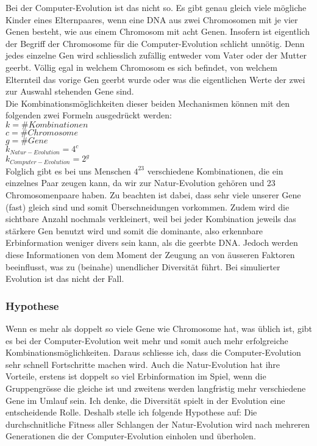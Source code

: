 \documentclass[11pt,a4paper,ngerman]{article}
\begin{document}
Bei der Computer-Evolution ist das nicht so. Es gibt genau gleich viele mögliche Kinder eines Elternpaares, wenn eine DNA aus zwei Chromosomen mit je vier Genen besteht, wie aus einem Chromosom mit acht Genen. Insofern ist eigentlich der Begriff der Chromosome für die Computer-Evolution schlicht unnötig. Denn jedes einzelne Gen wird schliesslich zufällig entweder vom Vater oder der Mutter geerbt. Völlig egal in welchem Chromosom es sich befindet, von welchem Elternteil das vorige Gen geerbt wurde oder was die eigentlichen Werte der zwei zur Auswahl stehenden Gene sind.\\

Die Kombinationsmöglichkeiten dieser beiden Mechanismen können mit den folgenden zwei Formeln ausgedrückt werden:\\

$k=\#Kombinationen$\\
$c=\#Chromosome$\\
$g=\#Gene$\\

\large
$k_{Natur-Evolution}=4^c$\\

$k_{Computer-Evolution}=2^g$\\

\normalsize
Folglich gibt es bei uns Menschen $4^{23}$ verschiedene Kombinationen, die ein einzelnes Paar zeugen kann, da wir zur Natur-Evolution gehören und 23 Chromosomenpaare haben. Zu beachten ist dabei, dass sehr viele unserer Gene (fast) gleich sind und somit Überschneidungen vorkommen. Zudem wird die sichtbare Anzahl nochmals verkleinert, weil bei jeder Kombination jeweils das stärkere Gen benutzt wird und somit die dominante, also erkennbare Erbinformation weniger divers sein kann, als die geerbte DNA. Jedoch werden diese Informationen von dem Moment der Zeugung an von äusseren Faktoren beeinflusst, was zu (beinahe) unendlicher Diversität führt. Bei simulierter Evolution ist das nicht der Fall.

\subsubsection{Hypothese}

Wenn es mehr als doppelt so viele Gene wie Chromosome hat, was üblich ist, gibt es bei der Computer-Evolution weit mehr und somit auch mehr erfolgreiche Kombinationsmöglichkeiten. Daraus schliesse ich, dass die Computer-Evolution sehr schnell Fortschritte machen wird. Auch die Natur-Evolution hat ihre Vorteile, erstens ist doppelt so viel Erbinformation im Spiel, wenn die Gruppengrösse die gleiche ist und zweitens werden langfristig mehr verschiedene Gene im Umlauf sein. Ich denke, die Diversität spielt in der Evolution eine entscheidende Rolle. Deshalb stelle ich folgende Hypothese auf: Die durchschnitliche Fitness aller Schlangen der Natur-Evolution wird nach mehreren Generationen die der Computer-Evolution einholen und überholen. 
\end{document}
